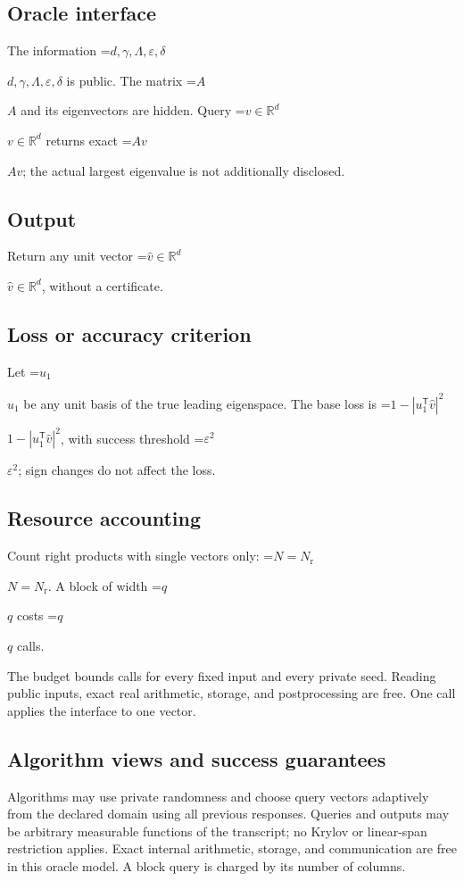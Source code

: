 \documentclass[10pt,a4paper]{article}
\newcommand{\AtlasMath}[1]{\par\begingroup\centering\setbox0=\hbox{$\displaystyle #1$}\ifdim\wd0>1.4\linewidth\typeout{ATLAS WIDE FORMULA: \the\wd0}\fi\ifdim\wd0>\linewidth\resizebox{\linewidth}{!}{\box0}\else\box0\fi\par\endgroup}
\newcommand{\AtlasInlineMath}[1]{\begingroup\setbox0=\hbox{$#1$}\ifdim\wd0>.4\linewidth\endgroup\AtlasMath{#1}\else\endgroup$#1$\fi}
\begin{document}
\subsection{Oracle interface}
The information \AtlasInlineMath{d,\gamma,\Lambda,\varepsilon,\delta} is public. The matrix \AtlasInlineMath{A} and its eigenvectors are hidden. Query \AtlasInlineMath{v\in\mathbb{R}^d} returns exact \AtlasInlineMath{Av}; the actual largest eigenvalue is not additionally disclosed.

\subsection{Output}
Return any unit vector \AtlasInlineMath{\widehat v\in\mathbb R^d}, without a certificate.

\subsection{Loss or accuracy criterion}
Let \AtlasInlineMath{u_1} be any unit basis of the true leading eigenspace. The base loss is \AtlasInlineMath{1-|u_1^{\mathsf T}\widehat{v}|^2}, with success threshold \AtlasInlineMath{\varepsilon^2}; sign changes do not affect the loss.

\subsection{Resource accounting}
Count right products with single vectors only: \AtlasInlineMath{N=N_{\mathrm r}}. A block of width \AtlasInlineMath{q} costs \AtlasInlineMath{q} calls.

The budget bounds calls for every fixed input and every private seed. Reading public inputs, exact real arithmetic, storage, and postprocessing are free. One call applies the interface to one vector.

\subsection{Algorithm views and success guarantees}
Algorithms may use private randomness and choose query vectors adaptively from the declared domain using all previous responses. Queries and outputs may be arbitrary measurable functions of the transcript; no Krylov or linear-span restriction applies. Exact internal arithmetic, storage, and communication are free in this oracle model. A block query is charged by its number of columns.
\end{document}

